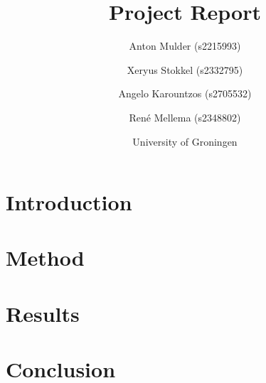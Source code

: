 \documentclass{article}
\title{\textbf{\huge Project Report}}
\author{Anton Mulder (s2215993) \and Xeryus Stokkel (s2332795) \and Angelo
    Karountzos (s2705532) \and Ren\'e Mellema (s2348802)}
\date{University of Groningen}
\begin{document}
\maketitle

\begin{abstract}
    \noindent
\end{abstract}

\section{Introduction}


\section{Method}


\section{Results}


\section{Conclusion}




\end{document}
